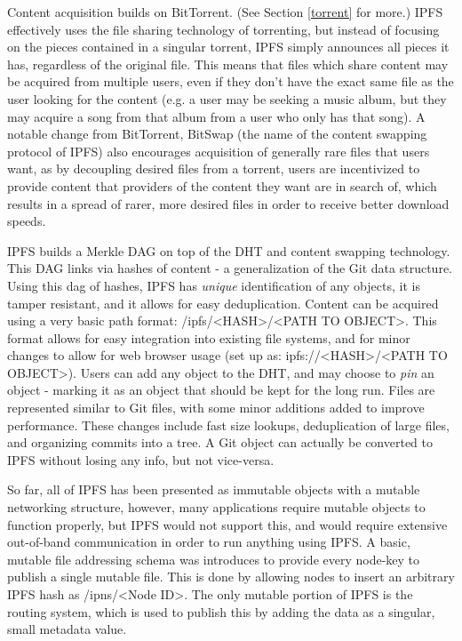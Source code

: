 \documentclass[12pt]{report}
\begin{document}
Content acquisition builds on BitTorrent. (See Section \ref{torrent} for more.) IPFS effectively uses the file sharing technology of torrenting, but instead of focusing on the pieces contained in a singular torrent, IPFS simply announces all pieces it has, regardless of the original file. This means that files which share content may be acquired from multiple users, even if they don't have the exact same file as the user looking for the content (e.g. a user may be seeking a music album, but they may acquire a song from that album from a user who only has that song). A notable change from BitTorrent, BitSwap (the name of the content swapping protocol of IPFS) also encourages acquisition of generally rare files that users want, as by decoupling desired files from a torrent, users are incentivized to provide content that providers of the content they want are in search of, which results in a spread of rarer, more desired files in order to receive better download speeds.\cite{ipfs}

IPFS builds a Merkle DAG on top of the DHT and content swapping technology. This DAG links via hashes of content - a generalization of the Git data structure.\cite{ipfs} Using this dag of hashes, IPFS has \emph{unique} identification of any objects, it is tamper resistant, and it allows for easy deduplication.\cite{ipfs} Content can be acquired using a very basic path format: /ipfs/<HASH>/<PATH TO OBJECT>. This format allows for easy integration into existing file systems, and for minor changes to allow for web browser usage (set up as: ipfs://<HASH>/<PATH TO OBJECT>). Users can add any object to the DHT, and may choose to \emph{pin} an object - marking it as an object that should be kept for the long run. Files are represented similar to Git files, with some minor additions added to improve performance. These changes include fast size lookups, deduplication of large files, and organizing commits into a tree.\cite{ipfs} A Git object can actually be converted to IPFS without losing any info, but not vice-versa.

So far, all of IPFS has been presented as immutable objects with a mutable networking structure, however, many applications require mutable objects to function properly, but IPFS would not support this, and would require extensive out-of-band communication in order to run anything using IPFS. A basic, mutable file addressing schema was introduces to provide every node-key to publish a single mutable file. This is done by allowing nodes to insert an arbitrary IPFS hash as /ipns/<Node ID>. The only mutable portion of IPFS is the routing system, which is used to publish this by adding the data as a singular, small metadata value.\cite{ipfs}
\end{document}
